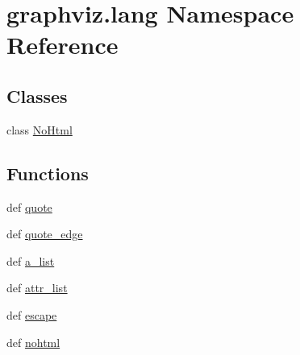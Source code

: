 \hypertarget{namespacegraphviz_1_1lang}{}\section{graphviz.\+lang Namespace Reference}
\label{namespacegraphviz_1_1lang}
\subsection*{Classes}
\begin{DoxyCompactItemize}
\item 
class \hyperlink{classgraphviz_1_1lang_1_1NoHtml}{No\+Html}
\end{DoxyCompactItemize}
\subsection*{Functions}
\begin{DoxyCompactItemize}
\item 
def \hyperlink{namespacegraphviz_1_1lang_a87faae5e0af721f10b5d187a40c0e40b}{quote}
\item 
def \hyperlink{namespacegraphviz_1_1lang_a6c1d176ac134c69af15c974d389133a8}{quote\+\_\+edge}
\item 
def \hyperlink{namespacegraphviz_1_1lang_a7cc7c98de63eca4bff562508715dcbfe}{a\+\_\+list}
\item 
def \hyperlink{namespacegraphviz_1_1lang_ac77163e4ddccb315c741433db4ba13e3}{attr\+\_\+list}
\item 
def \hyperlink{namespacegraphviz_1_1lang_a8a01a7a47f0f88a7bb35bb0d980902a3}{escape}
\item 
def \hyperlink{namespacegraphviz_1_1lang_a364494c427b4b98855394e2c3e61e574}{nohtml}
\end{DoxyCompactItemize}

